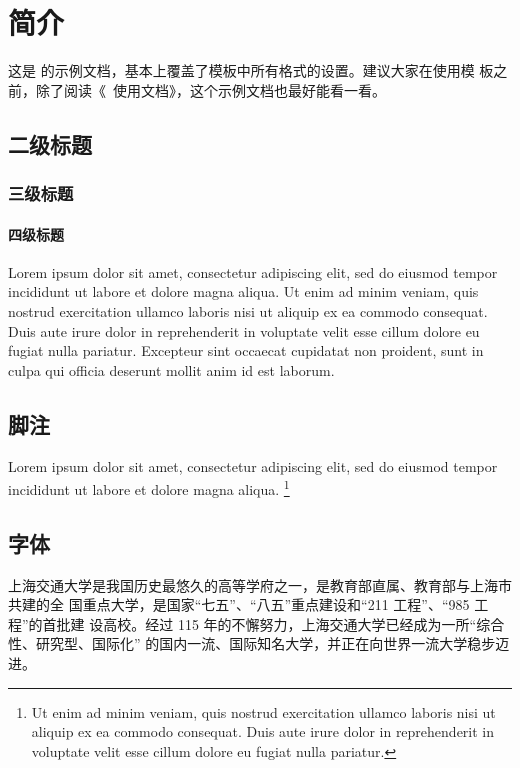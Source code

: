 
\chapter{简介}

这是 \csuthesis 的示例文档，基本上覆盖了模板中所有格式的设置。建议大家在使用模
板之前，除了阅读《\csuthesis\ 使用文档》，这个示例文档也最好能看一看。

\section{二级标题}

\subsection{三级标题}

\subsubsection{四级标题}

Lorem ipsum dolor sit amet, consectetur adipiscing elit, sed do eiusmod tempor
incididunt ut labore et dolore magna aliqua. Ut enim ad minim veniam, quis
nostrud exercitation ullamco laboris nisi ut aliquip ex ea commodo consequat.
Duis aute irure dolor in reprehenderit in voluptate velit esse cillum dolore eu
fugiat nulla pariatur. Excepteur sint occaecat cupidatat non proident, sunt in
culpa qui officia deserunt mollit anim id est laborum.

\section{脚注}

Lorem ipsum dolor sit amet, consectetur adipiscing elit, sed do eiusmod tempor
incididunt ut labore et dolore magna aliqua. \footnote{Ut enim ad minim veniam,
quis nostrud exercitation ullamco laboris nisi ut aliquip ex ea commodo
consequat. Duis aute irure dolor in reprehenderit in voluptate velit esse cillum
dolore eu fugiat nulla pariatur.}

\section{字体}


上海交通大学是我国历史最悠久的高等学府之一，是教育部直属、教育部与上海市共建的全
国重点大学，是国家“七五”、“八五”重点建设和“211 工程”、“985 工程”的首批建
设高校。经过 115 年的不懈努力，上海交通大学已经成为一所“综合性、研究型、国际化”
的国内一流、国际知名大学，并正在向世界一流大学稳步迈进。 

